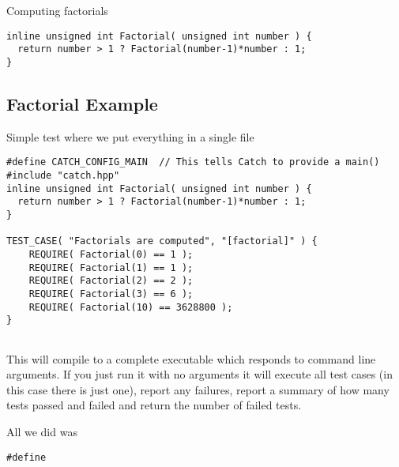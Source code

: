 \documentclass[%
oneside,                 %
final,                   %
10pt]{article}
\begin{document}
Computing factorials




\begin{verbatim}
inline unsigned int Factorial( unsigned int number ) {
  return number > 1 ? Factorial(number-1)*number : 1;
}

\end{verbatim}


\subsection*{Factorial Example}

Simple test where we put everything in a single file 
















\begin{verbatim}
#define CATCH_CONFIG_MAIN  // This tells Catch to provide a main()
#include "catch.hpp"
inline unsigned int Factorial( unsigned int number ) {
  return number > 1 ? Factorial(number-1)*number : 1;
}

TEST_CASE( "Factorials are computed", "[factorial]" ) {
    REQUIRE( Factorial(0) == 1 );
    REQUIRE( Factorial(1) == 1 );
    REQUIRE( Factorial(2) == 2 );
    REQUIRE( Factorial(3) == 6 );
    REQUIRE( Factorial(10) == 3628800 );
}


\end{verbatim}

This will compile to a complete executable which responds to command line arguments. If you just run it with no arguments it will execute all test cases (in this case there is just one), report any failures, report a summary of how many tests passed and failed and return the number of failed tests.

All we did was 


\begin{verbatim}
#define 

\end{verbatim}
\end{document}
